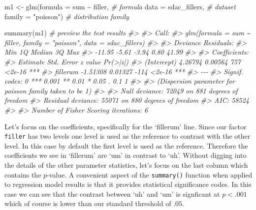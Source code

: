 \documentclass[
]{article}
\newenvironment{Shaded}{\begin{snugshade}}{\end{snugshade}}
\newcommand{\AttributeTok}[1]{\textcolor[rgb]{0.77,0.63,0.00}{#1}}
\newcommand{\CommentTok}[1]{\textcolor[rgb]{0.56,0.35,0.01}{\textit{#1}}}
\newcommand{\FunctionTok}[1]{\textcolor[rgb]{0.00,0.00,0.00}{#1}}
\newcommand{\NormalTok}[1]{#1}
\newcommand{\OtherTok}[1]{\textcolor[rgb]{0.56,0.35,0.01}{#1}}
\newcommand{\SpecialCharTok}[1]{\textcolor[rgb]{0.00,0.00,0.00}{#1}}
\newcommand{\StringTok}[1]{\textcolor[rgb]{0.31,0.60,0.02}{#1}}
\begin{document}
\begin{Shaded}
\begin{Highlighting}[]
\NormalTok{m1 }\OtherTok{\textless{}{-}} 
  \FunctionTok{glm}\NormalTok{(}\AttributeTok{formula =}\NormalTok{ sum }\SpecialCharTok{\textasciitilde{}}\NormalTok{ filler, }\CommentTok{\# formula}
      \AttributeTok{data =}\NormalTok{ sdac\_fillers, }\CommentTok{\# dataset}
      \AttributeTok{family =} \StringTok{"poisson"}\NormalTok{) }\CommentTok{\# distribution family}

\FunctionTok{summary}\NormalTok{(m1) }\CommentTok{\# preview the test results}
\CommentTok{\#\textgreater{} }
\CommentTok{\#\textgreater{} Call:}
\CommentTok{\#\textgreater{} glm(formula = sum \textasciitilde{} filler, family = "poisson", data = sdac\_fillers)}
\CommentTok{\#\textgreater{} }
\CommentTok{\#\textgreater{} Deviance Residuals: }
\CommentTok{\#\textgreater{}    Min      1Q  Median      3Q     Max  }
\CommentTok{\#\textgreater{} {-}11.95   {-}5.61   {-}3.94    0.80   41.99  }
\CommentTok{\#\textgreater{} }
\CommentTok{\#\textgreater{} Coefficients:}
\CommentTok{\#\textgreater{}             Estimate Std. Error z value Pr(\textgreater{}|z|)    }
\CommentTok{\#\textgreater{} (Intercept)  4.26794    0.00564     757   \textless{}2e{-}16 ***}
\CommentTok{\#\textgreater{} fillerum    {-}1.51308    0.01327    {-}114   \textless{}2e{-}16 ***}
\CommentTok{\#\textgreater{} {-}{-}{-}}
\CommentTok{\#\textgreater{} Signif. codes:  0 \textquotesingle{}***\textquotesingle{} 0.001 \textquotesingle{}**\textquotesingle{} 0.01 \textquotesingle{}*\textquotesingle{} 0.05 \textquotesingle{}.\textquotesingle{} 0.1 \textquotesingle{} \textquotesingle{} 1}
\CommentTok{\#\textgreater{} }
\CommentTok{\#\textgreater{} (Dispersion parameter for poisson family taken to be 1)}
\CommentTok{\#\textgreater{} }
\CommentTok{\#\textgreater{}     Null deviance: 72049  on 881  degrees of freedom}
\CommentTok{\#\textgreater{} Residual deviance: 55071  on 880  degrees of freedom}
\CommentTok{\#\textgreater{} AIC: 58524}
\CommentTok{\#\textgreater{} }
\CommentTok{\#\textgreater{} Number of Fisher Scoring iterations: 6}
\end{Highlighting}
\end{Shaded}

Let's focus on the coefficients, specifically for the `fillerum' line. Since our factor \texttt{filler} has two levels one level is used as the reference to contrast with the other level. In this case by default the first level is used as the reference. Therefore the coefficients we see in `fillerum' are `um' in contrast to `uh'. Without digging into the details of the other parameter statistics, let's focus on the last column which contains the \(p\)-value. A convenient aspect of the \texttt{summary()} function when applied to regression model results is that it provides statistical significance codes. In this case we can see that the contrast between `uh' and `um' is signficant at \(p < .001\) which of course is lower than our standard threshold of \(.05\).
\end{document}
